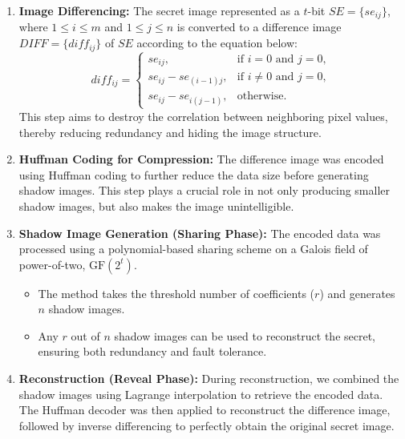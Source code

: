 \begin{enumerate}
    \item \textbf{Image Differencing:} The secret image represented as a $t$-bit $SE = \{se_{ij}\}$, where $1 \leq i \leq m$ and $1 \leq j \leq n$ is converted to a difference image $DIFF = \{diff_{ij}\}$ of $SE$ according to the equation below:
    \begin{equation}
        diff_{ij} =
        \begin{cases}
            se_{ij}, & \text{if } i = 0 \text{ and } j = 0, \\
            se_{ij} - se_{(i-1)j}, & \text{if } i \neq 0 \text{ and } j = 0, \\
            se_{ij} - se_{i(j-1)}, & \text{otherwise.}
        \end{cases}
    \end{equation}
    This step aims to destroy the correlation between neighboring pixel values, thereby reducing redundancy and hiding the image structure.
 
    \item \textbf{Huffman Coding for Compression:} The difference image was encoded using Huffman coding to further reduce the data size before generating shadow images. This step plays a crucial role in not only producing smaller shadow images, but also makes the image unintelligible.
 
    \item \textbf{Shadow Image Generation (Sharing Phase):} The encoded data was processed using a polynomial-based sharing scheme on a Galois field of power-of-two, $\mathrm{GF}(2^t)$.
    \begin{itemize}
        \item The method takes the threshold number of coefficients ($r$) and generates $n$ shadow images.
        \item Any $r$ out of $n$ shadow images can be used to reconstruct the secret, ensuring both redundancy and fault tolerance.
    \end{itemize}
 
    \item \textbf{Reconstruction (Reveal Phase):} During reconstruction, we combined the shadow images using Lagrange interpolation to retrieve the encoded data. The Huffman decoder was then applied to reconstruct the difference image, followed by inverse differencing to perfectly obtain the original secret image.
\end{enumerate}
 
